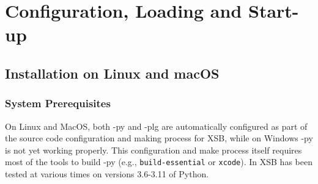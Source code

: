 \section{Configuration, Loading and Start-up} \label{px:config}



\subsection{Installation on Linux and macOS}

\subsubsection{System Prerequisites}

On Linux and MacOS, both \janus-py{} and \janus-plg{} are
automatically configured as part of the source code configuration and
making process for XSB, while on Windows \janus-py{} is not yet
working properly.  This configuration and make process itself requires
most of the tools to build \janus-py (e.g., {\tt build-essential} or
{\tt xcode}).  In XSB \janus{} has been tested at various times on
versions 3.6-3.11 of Python.

